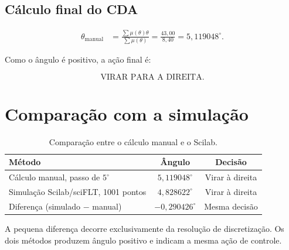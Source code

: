 \documentclass[12pt,a4paper]{article}
\begin{document}
\subsection*{Cálculo final do CDA}

\begin{align*}
\theta_{\text{manual}}
&=\frac{\sum\mu(\theta)\theta}{\sum\mu(\theta)}
=\frac{43{,}00}{8{,}40}
=\boxed{5{,}119048^\circ}.
\end{align*}

Como o ângulo é positivo, a ação final é:

\[
\boxed{\text{VIRAR PARA A DIREITA}}.
\]

\section{Comparação com a simulação}

\begin{table}[H]
\centering
\caption{Comparação entre o cálculo manual e o Scilab.}
\renewcommand{\arraystretch}{1.3}
\begin{tabular}{lcc}
\toprule
\textbf{Método} & \textbf{Ângulo} & \textbf{Decisão} \\
\midrule
Cálculo manual, passo de $5^\circ$ & $5{,}119048^\circ$ & Virar à direita \\
Simulação Scilab/sciFLT, 1001 pontos & $4{,}828622^\circ$ & Virar à direita \\
Diferença (simulado $-$ manual) & $-0{,}290426^\circ$ & Mesma decisão \\
\bottomrule
\end{tabular}
\end{table}

A pequena diferença decorre exclusivamente da resolução de discretização.
Os dois métodos produzem ângulo positivo e indicam a mesma ação de controle.
\end{document}
